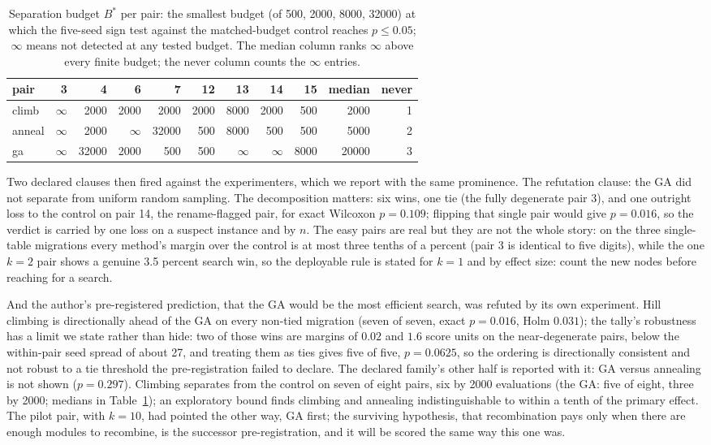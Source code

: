 \documentclass[11pt]{article}
\begin{document}
\begin{table}[t]
\centering
\caption{Separation budget $B^{*}$ per pair: the smallest budget (of 500, 2000, 8000,
32000) at which the five-seed sign test against the matched-budget control reaches
$p \le 0.05$; $\infty$ means not detected at any tested budget. The median column ranks
$\infty$ above every finite budget; the never column counts the $\infty$ entries.}
\label{tab:bstar}
\begin{tabular}{lrrrrrrrr|rr}
\toprule
pair & 3 & 4 & 6 & 7 & 12 & 13 & 14 & 15 & median & never \\
\midrule
climb  & $\infty$ & 2000 & 2000 & 2000 & 2000 & 8000 & 2000 & 500 & 2000 & 1 \\
anneal & $\infty$ & 2000 & $\infty$ & 32000 & 500 & 8000 & 500 & 500 & 5000 & 2 \\
ga     & $\infty$ & 32000 & 2000 & 500 & 500 & $\infty$ & $\infty$ & 8000 & 20000 & 3 \\
\bottomrule
\end{tabular}
\end{table}

Two declared clauses then fired against the experimenters, which we report with the same
prominence. The refutation clause: the GA did not separate from uniform random sampling.
The decomposition matters: six wins, one tie (the fully degenerate pair 3), and one
outright loss to the control on pair 14, the rename-flagged pair, for exact Wilcoxon
$p = 0.109$; flipping that single pair would give $p = 0.016$, so the verdict is carried
by one loss on a suspect instance and by $n$. The easy pairs are real but they are not the
whole story: on the three single-table migrations every method's margin over the control
is at most three tenths of a percent (pair 3 is identical to five digits), while the one
$k = 2$ pair shows a genuine 3.5 percent search win, so the deployable rule is stated for
$k = 1$ and by effect size: count the new nodes before reaching for a search.

And the author's pre-registered prediction, that the GA would be the most efficient
search, was refuted by its own experiment. Hill climbing is directionally ahead of the GA
on every non-tied migration (seven of seven, exact $p = 0.016$, Holm $0.031$); the tally's
robustness has a limit we state rather than hide: two of those wins are margins of $0.02$
and $1.6$ score units on the near-degenerate pairs, below the within-pair seed spread of
about 27, and treating them as ties gives five of five, $p = 0.0625$, so the ordering is
directionally consistent and not robust to a tie threshold the pre-registration failed to
declare. The declared family's other half is reported with it: GA versus annealing is not
shown ($p = 0.297$). Climbing separates from the control on seven of eight pairs, six by
2000 evaluations (the GA: five of eight, three by 2000; medians in
Table~\ref{tab:bstar}); an exploratory bound finds climbing and annealing
indistinguishable to within a tenth of the primary effect. The pilot pair, with $k = 10$,
had pointed the other way, GA first; the surviving hypothesis, that recombination pays
only when there are enough modules to recombine, is the successor pre-registration, and
it will be scored the same way this one was.
\end{document}
